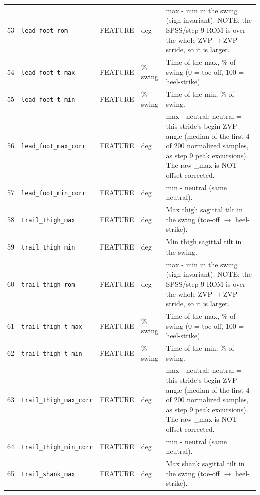 \begin{longtable}{@{}r p{3.6cm} p{1.55cm} p{1.15cm} p{8.6cm}@{}}
53 & \texttt{lead\_\allowbreak{}foot\_\allowbreak{}rom} & FEATURE & deg & max - min in the swing (sign-invariant). NOTE: the SPSS/step 9 ROM is over the whole ZVP$\rightarrow$ZVP stride, so it is larger. \\
54 & \texttt{lead\_\allowbreak{}foot\_\allowbreak{}t\_\allowbreak{}max} & FEATURE & \% swing & Time of the max, \% of swing (0 = toe-off, 100 = heel-strike). \\
55 & \texttt{lead\_\allowbreak{}foot\_\allowbreak{}t\_\allowbreak{}min} & FEATURE & \% swing & Time of the min, \% of swing. \\
56 & \texttt{lead\_\allowbreak{}foot\_\allowbreak{}max\_\allowbreak{}corr} & FEATURE & deg & max - neutral; neutral = this stride's begin-ZVP angle (median of the first 4 of 200 normalized samples, as step 9 peak excursions). The raw \_max is NOT offset-corrected. \\
57 & \texttt{lead\_\allowbreak{}foot\_\allowbreak{}min\_\allowbreak{}corr} & FEATURE & deg & min - neutral (same neutral). \\
58 & \texttt{trail\_\allowbreak{}thigh\_\allowbreak{}max} & FEATURE & deg & Max thigh sagittal tilt in the swing (toe-off $\rightarrow$ heel-strike). \\
59 & \texttt{trail\_\allowbreak{}thigh\_\allowbreak{}min} & FEATURE & deg & Min thigh sagittal tilt in the swing. \\
60 & \texttt{trail\_\allowbreak{}thigh\_\allowbreak{}rom} & FEATURE & deg & max - min in the swing (sign-invariant). NOTE: the SPSS/step 9 ROM is over the whole ZVP$\rightarrow$ZVP stride, so it is larger. \\
61 & \texttt{trail\_\allowbreak{}thigh\_\allowbreak{}t\_\allowbreak{}max} & FEATURE & \% swing & Time of the max, \% of swing (0 = toe-off, 100 = heel-strike). \\
62 & \texttt{trail\_\allowbreak{}thigh\_\allowbreak{}t\_\allowbreak{}min} & FEATURE & \% swing & Time of the min, \% of swing. \\
63 & \texttt{trail\_\allowbreak{}thigh\_\allowbreak{}max\_\allowbreak{}corr} & FEATURE & deg & max - neutral; neutral = this stride's begin-ZVP angle (median of the first 4 of 200 normalized samples, as step 9 peak excursions). The raw \_max is NOT offset-corrected. \\
64 & \texttt{trail\_\allowbreak{}thigh\_\allowbreak{}min\_\allowbreak{}corr} & FEATURE & deg & min - neutral (same neutral). \\
65 & \texttt{trail\_\allowbreak{}shank\_\allowbreak{}max} & FEATURE & deg & Max shank sagittal tilt in the swing (toe-off $\rightarrow$ heel-strike). \\

\end{longtable}

